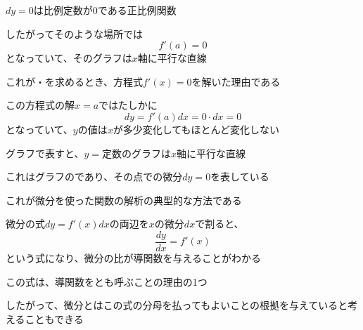 \documentclass[../book_infinite_continuous_math]{subfiles}
\begin{document}
\br

$dy=0$は比例定数が$0$である正比例関数

したがってそのような場所では
\begin{equation*}
  f'(a) = 0
\end{equation*}
となっていて、そのグラフは$x$軸に平行な直線

これが・を求めるとき、方程式$f'(x) = 0$を解いた理由である

この方程式の解$x=a$ではたしかに
\begin{equation*}
  dy = f'(a)dx = 0 \cdot dx = 0
\end{equation*}
となっていて、$y$の値は$x$が多少変化してもほとんど変化しない

\br

グラフで表すと、$y=\text{定数}$のグラフは$x$軸に平行な直線

これはグラフのであり、その点での微分$dy=0$を表している

これが微分を使った関数の解析の典型的な方法である

\br

微分の式$dy = f'(x)dx$の両辺を$x$の微分$dx$で割ると、
\begin{equation*}
  \dfrac{dy}{dx} = f'(x)
\end{equation*}
という式になり、微分の比が導関数を与えることがわかる

この式は、導関数をとも呼ぶことの理由の1つ

したがって、微分とはこの式の分母を払ってもよいことの根拠を与えていると考えることもできる
\end{document}
